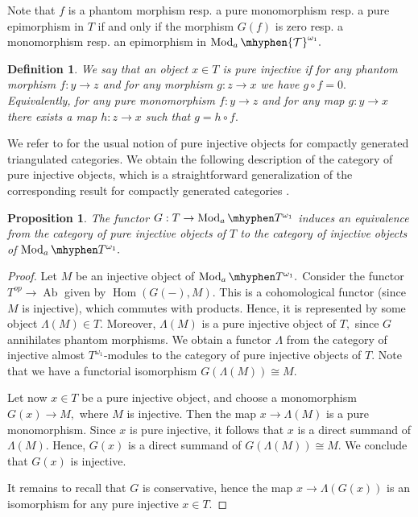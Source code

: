\documentclass[11pt,leqno]{amsart}
\newtheorem{defi}[theo]{Definition}
\newtheorem{prop}[theo]{Proposition}
\numberwithin{equation}{section}
\def\Hom{\operatorname{Hom}}
\newcommand{\hy}{\mhyphen}
\newcommand{\cT}{{\mathcal T}}
\newcommand{\Ab}{\operatorname{Ab}}
\newcommand{\Mod}{\operatorname{Mod}}
\begin{document}
Note that $f$ is a phantom morphism resp. a pure monomorphism resp. a pure epimorphism in $T$ if and only if the morphism $G(f)$ is zero resp. a monomorphism resp. an epimorphism in $\Mod_a\hy\cT^{\omega_1}.$ 

\begin{defi}We say that an object $x\in T$ is pure injective if for any phantom morphism $f:y\to z$ and for any morphism $g:z\to x$ we have $g\circ f=0.$ Equivalently, for any pure monomorphism $f:y\to z$ and for any map $g:y\to x$ there exists a map $h:z\to x$ such that $g=h\circ f.$\end{defi}

We refer to \cite{Kr00, GP04} for the usual notion of pure injective objects for compactly generated triangulated categories.
We obtain the following description of the category of pure injective objects, which is a straightforward generalization of the corresponding result for compactly generated categories \cite[Theorem 4.1]{GP04}.

\begin{prop}\label{prop:pure_injective} The functor $G:T\to \Mod_a\hy T^{\omega_1}$ induces an equivalence from the category of pure injective objects of $T$ to the category of injective objects of $\Mod_a\hy T^{\omega_1}.$\end{prop}

\begin{proof}Let $M$ be an injective object of $\Mod_a\hy T^{\omega_1}.$ Consider the functor $T^{op}\to\Ab$ given by $\Hom(G(-),M).$ This is a cohomological functor (since $M$ is injective), which commutes with products. Hence, it is represented by some object $\Lambda(M)\in T.$ Moreover, $\Lambda(M)$ is a pure injective object of $T,$ since $G$ annihilates phantom morphisms. We obtain a functor $\Lambda$ from the category of injective almost $T^{\omega_1}$-modules to the category of pure injective objects of $T.$ Note that we have a functorial isomorphism $G(\Lambda(M))\cong M.$

Let now $x\in T$ be a pure injective object, and choose a monomorphism $G(x)\to M,$ where $M$ is injective. Then the map $x\to \Lambda(M)$ is a pure monomorphism. Since $x$ is pure injective, it follows that $x$ is a direct summand of $\Lambda(M).$ Hence, $G(x)$ is a direct summand of $G(\Lambda(M))\cong M.$ We conclude that $G(x)$ is injective.

It remains to recall that $G$ is conservative, hence the map $x\to \Lambda(G(x))$ is an isomorphism for any pure injective $x\in T.$\end{proof}
\end{document}
